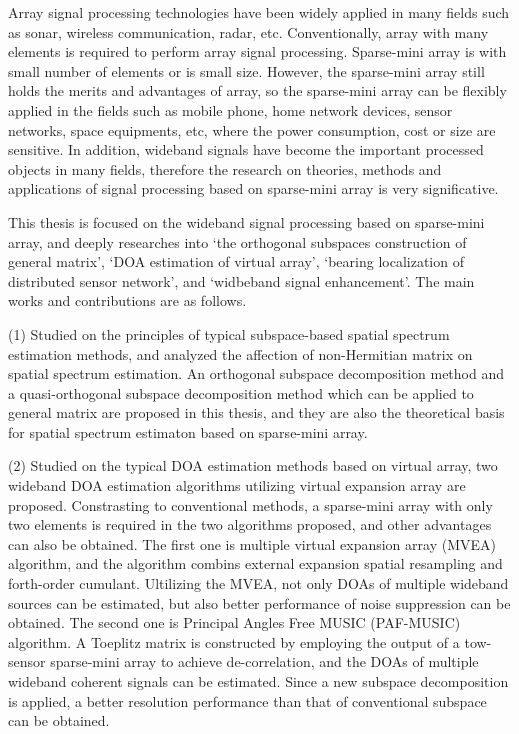 \begin{ENGabstract}
	Array signal processing technologies have been widely applied in many fields such as sonar, wireless communication, radar, etc. Conventionally, array with many elements is required to perform array signal processing. Sparse-mini array is with small number of elements or is small size. However, the sparse-mini array still holds the merits and advantages of array, so the sparse-mini array can be flexibly applied in the fields such as mobile phone, home network devices, sensor networks, space equipments, etc, where the power consumption, cost or size are sensitive. In addition, wideband signals have become the important processed objects in many fields, therefore the research on theories, methods and applications of signal processing based on sparse-mini array is very significative.


	This thesis is focused on the wideband signal processing based on sparse-mini array, and deeply researches into ‘the orthogonal subspaces construction of general matrix’, ‘DOA estimation of virtual array’, ‘bearing localization of distributed sensor network’, and ‘widbeband signal enhancement’. The main works and contributions are as follows.


	(1) Studied on the principles of typical subspace-based spatial spectrum estimation methods, and analyzed the affection of non-Hermitian matrix on spatial spectrum estimation. An orthogonal subspace decomposition method and a quasi-orthogonal subspace decomposition method which can be applied to general matrix are proposed in this thesis, and they are also the theoretical basis for spatial spectrum estimaton based on sparse-mini array.


	(2) Studied on the typical DOA estimation methods based on virtual array, two wideband DOA estimation algorithms utilizing virtual expansion array are proposed. Constrasting to conventional methods, a sparse-mini array with only two elements is required in the two algorithms proposed, and other advantages can also be obtained. The first one is multiple virtual expansion array (MVEA) algorithm, and the algorithm combins external expansion spatial resampling and forth-order cumulant. Ultilizing the MVEA, not only DOAs of multiple wideband sources can be estimated, but also better performance of noise suppression can be obtained. The second one is Principal Angles Free MUSIC (PAF-MUSIC) algorithm. A Toeplitz matrix is constructed by employing the output of a tow-sensor sparse-mini array to achieve de-correlation, and the DOAs of multiple wideband coherent signals can be estimated. Since a new subspace decomposition is applied, a better resolution performance than that of conventional subspace can be obtained.



\end{ENGabstract}
